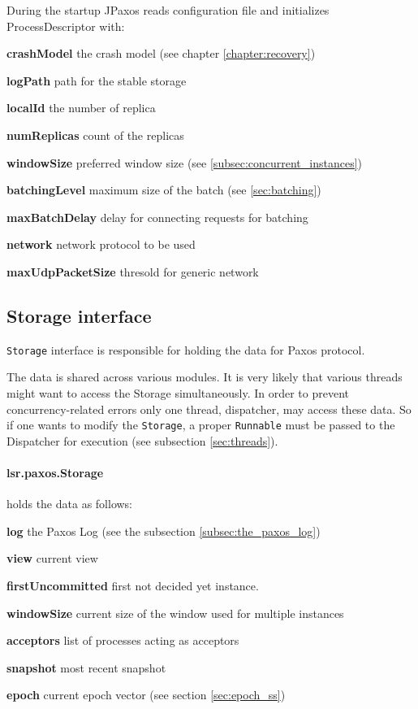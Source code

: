 During the startup JPaxos reads configuration file and initializes ProcessDescriptor with:
\begin{tightList}[\setlength{\labelwidth}{0em}]
 \item[\textbf{crashModel}] the crash model (see chapter \ref{chapter:recovery})
 \item[\textbf{logPath}] path for the stable storage
 \item[\textbf{localId}] the number of replica
 \item[\textbf{numReplicas}] count of the replicas
 \item[\textbf{windowSize}] preferred window size (see \ref{subsec:concurrent_instances})
 \item[\textbf{batchingLevel}] maximum size of the batch (see \ref{sec:batching})
 \item[\textbf{maxBatchDelay}] delay for connecting requests for batching
 \item[\textbf{network}] network protocol to be used
 \item[\textbf{maxUdpPacketSize}] thresold for generic network
\end{tightList}

\subsection{Storage interface}
\label{subsec:storage_interface}

\texttt{Storage} interface is responsible for holding the data for Paxos
protocol.

The data is shared across various modules.
It is very likely that various threads might want to access the Storage simultaneously. In order to prevent concurrency-related errors only one thread, dispatcher, may access these data. So if one wants to modify the \texttt{Storage}, a proper \texttt{Runnable} must be passed to the Dispatcher for execution (see subsection \ref{sec:threads}).

\paragraph{\normalfont \ttfamily lsr.paxos.Storage}
holds the data as follows:
\begin{tightList}[\setlength{\labelwidth}{0em}]
  \item[\textbf{log}] the Paxos Log (see the subsection \ref{subsec:the_paxos_log})
  \item[\textbf{view}] current view
  \item[\textbf{firstUncommitted}] first not decided yet instance.
  \item[\textbf{windowSize}] current size of the window used for multiple instances
  \item[\textbf{acceptors}] list of processes acting as acceptors
  \item[\textbf{snapshot}] most recent snapshot
  \item[\textbf{epoch}] current epoch vector (see section \ref{sec:epoch_ss})
\end{tightList}

